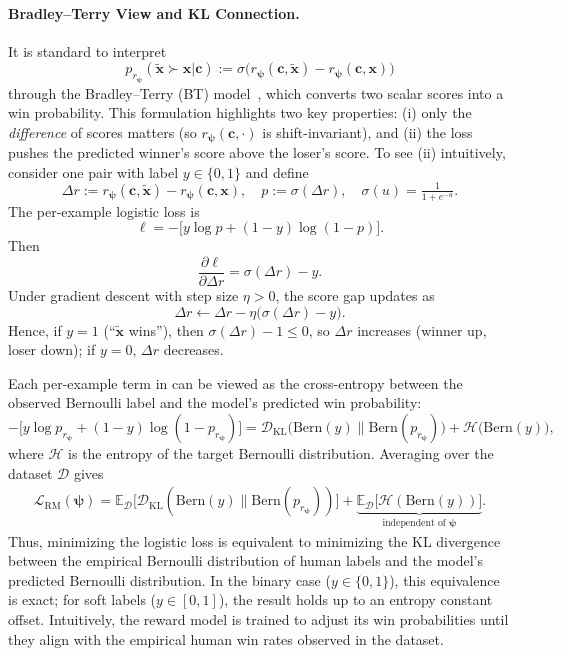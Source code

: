 \paragraph{Bradley--Terry View and KL Connection.}
It is standard to interpret
\[
p_{r_{\bm\psi}}(\tilde{\mathbf x}\succ \mathbf x|\mathbf c)
:= \sigma \big(r_{\bm\psi}(\mathbf c,\tilde{\mathbf x})-r_{\bm\psi}(\mathbf c,\mathbf x)\big)
\]
through the Bradley--Terry (BT) model~\citep{bradley1952rank}, which converts two scalar scores into a win probability.  
This formulation highlights two key properties: (i) only the \emph{difference} of scores matters (so $r_{\bm\psi}(\mathbf c,\cdot)$ is shift-invariant), and (ii) the loss pushes the predicted winner’s score above the loser’s score. To see (ii) intuitively, consider one pair with label $y\in\{0,1\}$ and define
\[
\Delta r := r_{\bm\psi}(\mathbf c,\tilde{\mathbf x})-r_{\bm\psi}(\mathbf c,\mathbf x),
\quad
p:=\sigma(\Delta r),\quad \sigma(u)=\tfrac{1}{1+e^{-u}}.
\]
The per-example logistic loss is
\[
\ell=-\big[y\log p+(1-y)\log(1-p)\big].
\]
Then
\[
\frac{\partial \ell}{\partial \Delta r}=\sigma(\Delta r)-y.
\]
Under gradient descent with step size $\eta>0$, the score gap updates as
\[
\Delta r \leftarrow \Delta r-\eta\big(\sigma(\Delta r)-y\big).
\]
Hence, if $y=1$ (``$\tilde{\mathbf x}$ wins''), then $\sigma(\Delta r)-1\le 0$, so $\Delta r$ increases (winner up, loser down); if $y=0$, $\Delta r$ decreases.


Each per-example term in  can be viewed as the cross-entropy between the observed Bernoulli label and the model’s predicted win probability:
\[
-\big[y\log p_{r_{\bm\psi}}+(1-y)\log(1-p_{r_{\bm\psi}})\big]
= \mathcal D_{\mathrm{KL}} \big(\mathrm{Bern}(y) \big\| \mathrm{Bern}(p_{r_{\bm\psi}})\big)
+ \mathcal H \big(\mathrm{Bern}(y)\big),
\]
where $\mathcal H$ is the entropy of the target Bernoulli distribution.
Averaging over the dataset $\mathcal D$ gives
\begin{align}\label{eq:reward_loss}
    \mathcal L_{\mathrm{RM}}(\bm\psi)
= \mathbb E_{\mathcal D} \Big[\mathcal D_{\mathrm{KL}}\left(\mathrm{Bern}(y) \big\| \mathrm{Bern}(p_{r_{\bm\psi}})\right)\Big]
+ \underbrace{\mathbb E_{\mathcal D} \big[\mathcal H(\mathrm{Bern}(y))\big]}_{\text{independent of }\bm\psi}.
\end{align}
Thus, minimizing the logistic loss is equivalent to minimizing the KL divergence between the empirical Bernoulli distribution of human labels and the model’s predicted Bernoulli distribution. In the binary case ($y\in\{0,1\}$), this equivalence is exact; for soft labels ($y\in[0,1]$), the result holds up to an entropy constant offset. Intuitively, the reward model is trained to adjust its win probabilities until they align with the empirical human win rates observed in the dataset.

